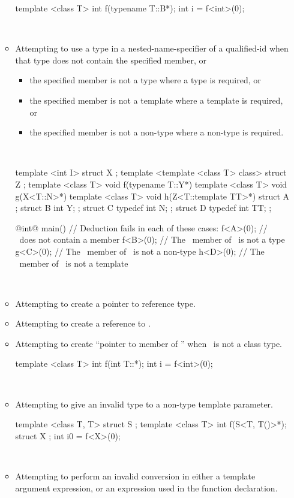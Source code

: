 \documentclass[american]{book}
\begin{document}
\begin{paras}
\begin{itemize}
\begin{itemize}
\begin{codeblock}
template <class T> int f(typename T::B*);
int i = f<int>(0);
\end{codeblock}
\exitexample\ 
\item
Attempting to use a type in a nested-name-specifier of a qualified-id when
that type does not contain the specified member, or
\begin{itemize}
\item
the specified member is not a type where a type is required, or
\item
the specified member is not a template where a template is required, or
\item
the specified member is not a non-type where a non-type is
required.
\end{itemize}
\enterexample\ 

\begin{codeblock}
template <int I> struct X { };
template <template <class T> class> struct Z { };
template <class T> void f(typename T::Y*){}
template <class T> void g(X<T::N>*){}
template <class T> void h(Z<T::template TT>*){}
struct A {};
struct B { int Y; };
struct C {
    typedef int N;
};
struct D {
    typedef int TT;
};

@\textcolor{black}{int}@ main()
{
    // Deduction fails in each of these cases:
    f<A>(0);  // \ does not contain a member 
    f<B>(0);  // The \tcode{Y}\ member of \ is not a type
    g<C>(0);  // The \tcode{N}\ member of \tcode{C}\ is not a non-type
    h<D>(0);  // The \tcode{TT}\ member of \tcode{D}\ is not a template
}
\end{codeblock}
\exitexample\ 
\item
Attempting to create a pointer to reference type.
\item
Attempting to create a reference to .
\item
Attempting to create ``pointer to member of \tcode{T}'' when \tcode{T}\ is not a
class type.
\enterexample\ 

\begin{codeblock}
template <class T> int f(int T::*);
int i = f<int>(0);
\end{codeblock}
\exitexample\ 
\item
Attempting to give an invalid type to a non-type template parameter.
\enterexample\
\begin{codeblock}
template <class T, T> struct S {};
template <class T> int f(S<T, T()>*);
struct X {};
int i0 = f<X>(0);
\end{codeblock}
\exitexample\
\item
Attempting to perform an invalid conversion in either a template
argument expression, or an expression used in the function
declaration.
\enterexample\ 


\end{itemize}
\end{itemize}
\end{paras}
\end{document}
